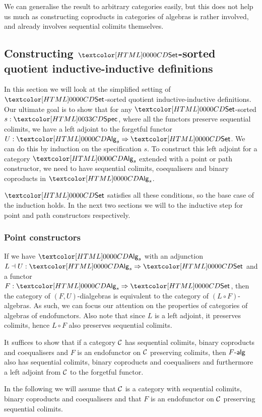 We can generalise the result to arbitrary categories easily, but this
does not help us much as constructing coproducts in categories of
algebras is rather involved, and already involves sequential colimits
themselves.

\subsection{Constructing $\Set$-sorted quotient inductive-inductive definitions}

In this section we will look at the simplified setting of $\Set$-sorted quotient
inductive-inductive definitions. Our ultimate goal is to show that for
any $\Set$-sorted $s : \specty$, where all the functors preserve
sequential colimits, we have a left adjoint to the forgetful functor
$U : \Func{\Alg_s}{\Set}$. We can do this by induction on the
specification $s$. To construct this left adjoint for a category
$\Alg_s$ extended with a point or path constructor, we need to have
sequential colimits, coequalisers and binary coproducts in $\Alg_s$.

$\Set$ satisfies all these conditions, so the base case of the
induction holds. In the next two sections we will to the inductive
step for point and path constructors respectively.

\subsubsection{Point constructors}

If we have $\Alg_s$ with an adjunction
$L \dashv U : \Func{\Alg_s}{\Set}$ and a functor
$F : \Func{\Alg_s}{\Set}$, then the category of $(F,U)$-dialgebras is
equivalent to the category of $(L \circ F)$-algebras. As such, we can
focus our attention on the properties of categories of algebras of
endofunctors. Also note that since $L$ is a left adjoint, it preserves
colimits, hence $L \circ F$ also preserves sequential colimits.

It suffices to show that if a category $\mathcal{C}$ has sequential colimits,
binary coproducts and coequalisers and $F$ is an endofunctor on $\mathcal{C}$
preserving colimits, then $\algcat{F}$ also has sequential colimits,
binary coproducts and coequalisers and furthermore a left adjoint from
$\mathcal{C}$ to the forgetful functor.

In the following we will assume that $\mathcal{C}$ is a category with
sequential colimits, binary coproducts and coequalisers and that $F$
is an endofunctor on $\mathcal{C}$ preserving sequential colimits.


